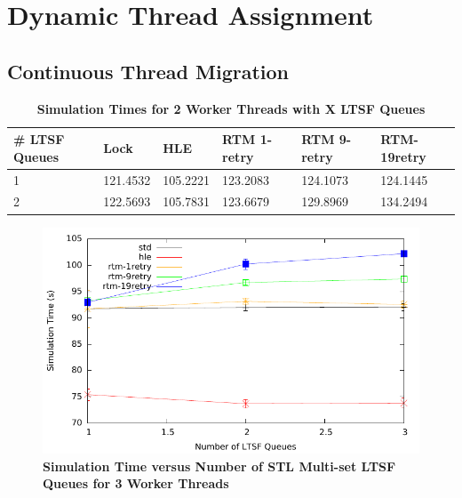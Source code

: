 \documentclass[11pt]{book}
\begin{document}
\section{Dynamic Thread Assignment}

\subsection{Continuous Thread Migration}

\begin{table}[H]
    \centering
    \begin{tabular}{l|p{2cm}|p{2cm}|p{2cm}|p{2cm}|p{2cm}}
        \textbf{\# LTSF Queues}&Lock &HLE &RTM 1-retry &RTM 9-retry &RTM-19retry \\
        \hline
        \midrule
            1 &121.4532  &105.2221 &123.2083  &124.1073 &124.1445 \\ 
            2 &122.5693  &105.7831 &123.6679  &129.8969 &134.2494 \\
    \end{tabular}
    \caption{\textbf{Simulation Times for 2 Worker Threads with X LTSF Queues}}
    \label{tab:contThrMig_2threadsXschq}
\end{table}

\begin{figure}[H]
    \centering
    \graphicspath{ {./figures/} }
    \includegraphics[width=\textwidth,height=\textheight,keepaspectratio]{contThrMig-hugeEpidemicSim-timeVSschedQs-multiset-3thread}
    \caption{\textbf{Simulation Time versus Number of STL Multi-set LTSF Queues
    for 3 Worker Threads}}
    \label{fig:contThrMig_timeVSschq_3threads}
\end{figure}
\end{document}
